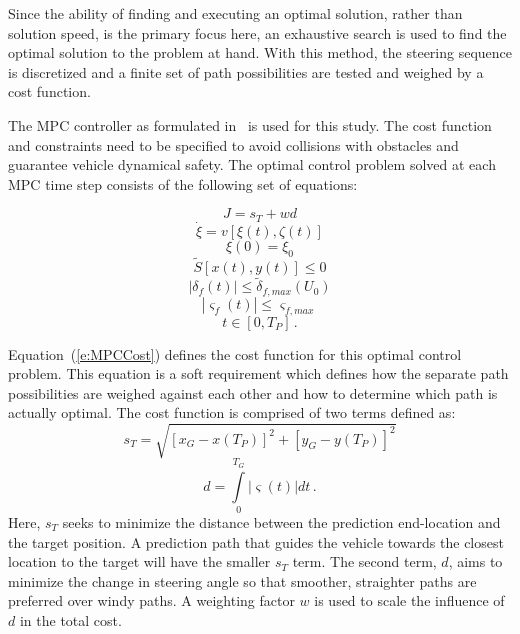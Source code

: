 \documentclass[12pt,onecolumn]{report}
\begin{document}
Since the ability of finding and executing an optimal solution, rather than solution speed, is the primary focus here, an exhaustive search is used to find the optimal solution to the problem at hand. With this method, the steering sequence is discretized and a finite set of path possibilities are tested and weighed by a cost function. 

The MPC controller as formulated in~\cite{ModelFidelity2016} is used for this study. The cost function and constraints need to be specified to avoid collisions with obstacles and guarantee vehicle dynamical safety. The optimal control problem solved at each MPC time step consists of the following set of equations:

\begin{equation}\label{e:MPCCost}
J = s_T + wd 
\end{equation}
\begin{equation}\label{e:State_ODE}
\dot{\xi} = v\left[\xi\left(t\right),\zeta\left(t\right)\right] 
\end{equation}
\begin{equation}\label{e:InitialStates}
\xi\left(0\right) = \xi_0 
\end{equation}
\begin{equation}\label{e:SafeArea}
\tilde{S}\left[x\left(t\right),y\left(t\right)\right] \leq0  
\end{equation}
\begin{equation}\label{e:SteerLimit}
\left|\delta_f\left(t\right)\right| \leq\tilde{\delta}_{f,max}\left(U_0\right) 
\end{equation}
\begin{equation}\label{e:SteerRateLimit}
\left|\varsigma_f\left(t\right)\right| \leq\varsigma_{f,max} 
\end{equation}
\begin{equation}\label{e:TimeDomain}
t \in \left[0,T_P\right] \,.
\end{equation}

Equation~(\ref{e:MPCCost}) defines the cost function for this optimal control problem. This equation is a soft requirement which defines how the separate path possibilities are weighed against each other and how to determine which path is actually optimal. The cost function is comprised of two terms defined as:
%
\begin{equation}\label{e:DistanceCost}
s_T = \sqrt{\left[ x_G - x\left(T_P\right)\right]^2 + \left[y_G - y\left(T_P\right)\right]^2 }
\end{equation}
\begin{equation}\label{e:TurningCost}
d = \int \limits_0^{T_G} \left|\varsigma\left(t\right)\right| dt \,.
\end{equation}
%
Here, $s_{T}$ seeks to minimize the distance between the prediction end-location and the target position. A prediction path that guides the vehicle towards the closest location to the target will have the smaller $s_{T}$ term. The second term, $d$, aims to minimize the change in steering angle so that smoother, straighter paths are preferred over windy paths. A weighting factor $w$ is used to scale the influence of $d$ in the total cost.
\end{document}
